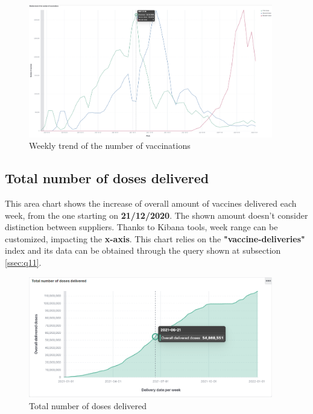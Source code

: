 \documentclass{article}[IEEEtran]
\begin{document}
\begin{figure}[H]
\begin{center}
    \includegraphics[width=0.95\textwidth, frame]{Weekly trend of the number of vaccinations.png}
    \caption{Weekly trend of the number of vaccinations}
\end{center}
\end{figure}

\subsection{Total number of doses delivered}\label{ssec:dash4}

This area chart shows the increase of overall amount of vaccines delivered each week, from the one starting on \textbf{21/12/2020}.
The shown amount doesn't consider distinction between suppliers.  Thanks to Kibana tools, week range can be customized, impacting the \textbf{x-axis}. This chart relies on the \textbf{"vaccine-deliveries"} index and its data can be obtained through the query shown at subsection \ref{ssec:q11}.

\begin{figure}[H]
\begin{center}
    \includegraphics[width=0.95\textwidth, frame]{Total number of doses delivered.png}
    \caption{Total number of doses delivered}
\end{center}
\end{figure}
\end{document}
